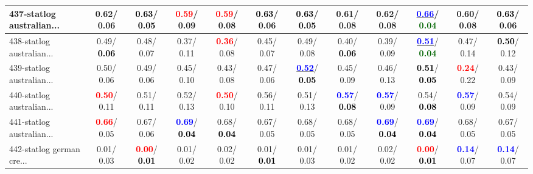 \begin{table}[h]
\begin{center}
{\begin{tabular}{lc|c|c|c|c|c|c|c|c|c|c}
437-statlog australian... &   0.62/  0.06 & \textcolor{black}{\textbf{  0.63}}/\textcolor{black}{\textbf{  0.05}} & \textcolor{red}{\textbf{  0.59}}/  0.09 & \textcolor{red}{\textbf{  0.59}}/  0.08 & \textcolor{black}{\textbf{  0.63}}/  0.06 & \textcolor{black}{\textbf{  0.63}}/\textcolor{black}{\textbf{  0.05}} &   0.61/  0.08 &   0.62/  0.08 & \underline{\textcolor{blue}{\textbf{  0.66}}}/\textcolor{darkgreen}{\textbf{  0.04}} &   0.60/  0.08 & \textcolor{black}{\textbf{  0.63}}/  0.06 \\ \hline
438-statlog australian... &   0.49/\textcolor{black}{\textbf{  0.06}} &   0.48/  0.07 &   0.37/  0.11 & \textcolor{red}{\textbf{  0.36}}/  0.08 &   0.45/  0.07 &   0.49/  0.08 &   0.40/\textcolor{black}{\textbf{  0.06}} &   0.39/  0.09 & \underline{\textcolor{blue}{\textbf{  0.51}}}/\textcolor{darkgreen}{\textbf{  0.04}} &   0.47/  0.14 & \textcolor{black}{\textbf{  0.50}}/  0.12 \\
439-statlog australian... &   0.50/  0.06 &   0.49/  0.06 &   0.45/  0.10 &   0.43/  0.08 &   0.47/  0.06 & \underline{\textcolor{blue}{\textbf{  0.52}}}/\textcolor{black}{\textbf{  0.05}} &   0.45/  0.09 &   0.46/  0.13 & \textcolor{black}{\textbf{  0.51}}/\textcolor{black}{\textbf{  0.05}} & \textcolor{red}{\textbf{  0.24}}/  0.22 &   0.43/  0.09 \\
440-statlog australian... & \textcolor{red}{\textbf{  0.50}}/  0.11 &   0.51/  0.11 &   0.52/  0.13 & \textcolor{red}{\textbf{  0.50}}/  0.10 &   0.56/  0.11 &   0.51/  0.13 & \textcolor{blue}{\textbf{  0.57}}/\textcolor{black}{\textbf{  0.08}} & \textcolor{blue}{\textbf{  0.57}}/  0.09 &   0.54/\textcolor{black}{\textbf{  0.08}} & \textcolor{blue}{\textbf{  0.57}}/  0.09 &   0.54/  0.09 \\
441-statlog australian... & \textcolor{red}{\textbf{  0.66}}/  0.05 &   0.67/  0.06 & \textcolor{blue}{\textbf{  0.69}}/\textcolor{black}{\textbf{  0.04}} &   0.68/\textcolor{black}{\textbf{  0.04}} &   0.67/  0.05 &   0.68/  0.05 &   0.68/  0.05 & \textcolor{blue}{\textbf{  0.69}}/\textcolor{black}{\textbf{  0.04}} & \textcolor{blue}{\textbf{  0.69}}/\textcolor{black}{\textbf{  0.04}} &   0.68/  0.05 &   0.67/  0.05 \\
442-statlog german cre... &   0.01/  0.03 & \textcolor{red}{\textbf{  0.00}}/\textcolor{black}{\textbf{  0.01}} &   0.01/  0.02 &   0.02/  0.02 &   0.01/\textcolor{black}{\textbf{  0.01}} &   0.01/  0.03 &   0.01/  0.02 &   0.02/  0.02 & \textcolor{red}{\textbf{  0.00}}/\textcolor{black}{\textbf{  0.01}} & \textcolor{blue}{\textbf{  0.14}}/  0.07 & \textcolor{blue}{\textbf{  0.14}}/  0.07 \\

\end{tabular}}
\end{center}
\end{table}
